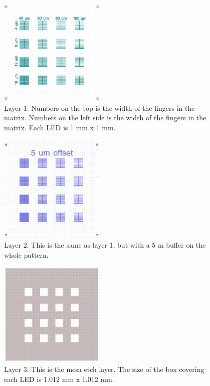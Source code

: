 

\begin{figure}[ht]
    \centering
    \includegraphics[width=0.45\textwidth]{figures/CleWin_L1.png}
    \caption{
        Layer 1. 
        Numbers on the top is the width of the fingers in the matrix.
        Numbers on the left side is the width of the fingers in the matrix.
        Each LED is 1 mm x 1 mm. 
    }
    \label{fig:CleWin_L1}
\end{figure}


\begin{figure}[ht]
    \centering
    \includegraphics[width=0.45\textwidth]{figures/CleWin_L2.png}
    \caption{
        Layer 2. 
        This is the same as layer 1, but with a 5 \textmu m buffer on the whole pattern. 
    }
    \label{fig:CleWin_L2}
\end{figure}


\begin{figure}[ht]
    \centering
    \includegraphics[width=0.45\textwidth]{figures/CleWin_L3.png}
    \caption{
        Layer 3. 
        This is the mesa etch layer. 
        The size of the box covering each LED is 1.012 mm x 1.012 mm.
    }
    \label{fig:CleWin_L3}
\end{figure}


